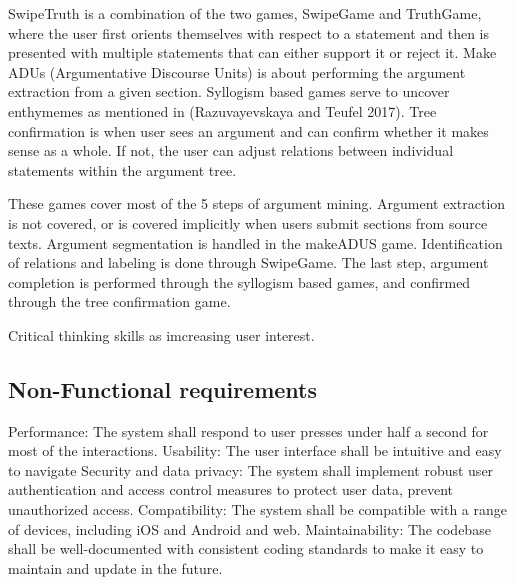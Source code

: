 \documentclass{report}
\begin{document}
SwipeTruth is a combination of the two games, SwipeGame and TruthGame, where the user first orients themselves with respect to a statement and then is presented with multiple statements that can either support it or reject it.
Make ADUs (Argumentative Discourse Units) is about performing the argument extraction from a given section.
Syllogism based games serve to uncover enthymemes as mentioned in (Razuvayevskaya and Teufel 2017). 
Tree confirmation is when user sees an argument and can confirm whether it makes sense as a whole. If not, the user can adjust relations between individual statements within the argument tree.

These games cover most of the 5 steps of argument mining. 
Argument extraction is not covered, or is covered implicitly when users submit sections from source texts. Argument segmentation is handled in the makeADUS game. Identification of relations and labeling is done through SwipeGame. The last step, argument completion is performed through the syllogism based games, and confirmed through the tree confirmation game.


Critical thinking skills as imcreasing user interest.

\subsection{Non-Functional requirements}
Performance: The system shall respond to user presses under half a second for most of the interactions.
Usability: The user interface shall be intuitive and easy to navigate
Security and data privacy: The system shall implement robust user authentication and access control measures to protect user data, prevent unauthorized access.
Compatibility: The system shall be compatible with a range of devices, including iOS and Android and web.
Maintainability: The codebase shall be well-documented with consistent coding standards to make it easy to maintain and update in the future.
\end{document}
